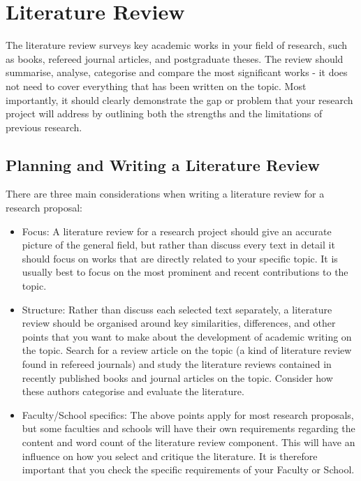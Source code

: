 \documentclass[12pt, a4paper]{article}
\begin{document}
\section{Literature Review}
The literature review surveys key academic works in your field of research, such as books, refereed journal articles, and postgraduate theses. The review should summarise, analyse, categorise and compare the most significant works - it does not need to cover everything that has been written on the topic. Most importantly, it should clearly demonstrate the gap or problem that your research project will address by outlining both the strengths and the limitations of previous research.

\subsection{Planning and Writing a Literature Review}

There are three main considerations when writing a literature review for a research proposal:

\begin{itemize}
\item Focus: A literature review for a research project should give an accurate picture of the general field, but rather than discuss every text in detail it should focus on works that are directly related to your specific topic. It is usually best to focus on the most prominent and recent contributions to the topic.
\item Structure: Rather than discuss each selected text separately, a literature review should be organised around key similarities, differences, and other points that you want to make about the development of academic writing on the topic. Search for a review article on the topic (a kind of literature review found in refereed journals) and study the literature reviews contained in recently published books and journal articles on the topic. Consider how these authors categorise and evaluate the literature.
\item Faculty/School specifics: The above points apply for most research proposals, but some faculties and schools will have their own requirements regarding the content and word count of the literature review component. This will have an influence on how you select and critique the literature. It is therefore important that you check the specific requirements of your Faculty or School.
\end{itemize}
\end{document}
